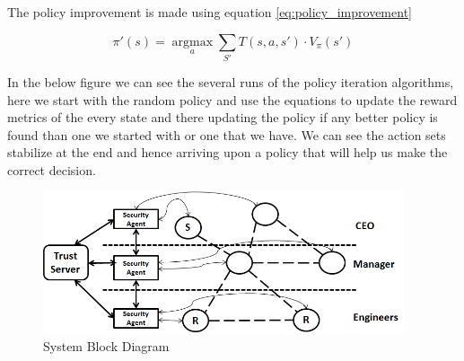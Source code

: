 The policy improvement is made using equation \ref{eq:policy_improvement}

\begin{equation} 
    \label{eq:policy_improvement}
    \pi'(s) = \operatorname*{argmax}_a \sum_{S'} T(s,a,s') \cdot V_\pi(s')
\end{equation}



In the below figure we can see the several runs of the policy iteration
algorithms, here we start with the random policy and use the equations to update
the reward metrics of the every state and there updating the policy if any
better policy is found than one we started with or one that we have. We can see
the action sets stabilize at the end and hence arriving upon a policy that will
help us make the correct decision.
\begin{figure}[hb]
    \label{fig:SystemBlockDiagram}
    \begin{center}
        \includegraphics[width=0.95\textwidth]{Figures/Planning_Figure_1.png}
        \caption{System Block Diagram}
    \end{center}
\end{figure}

